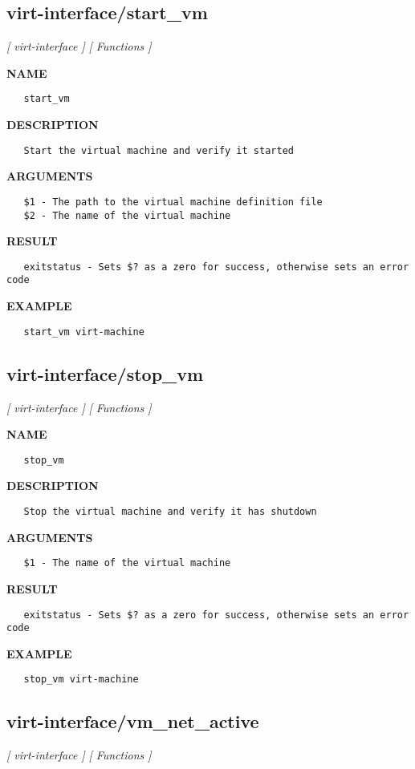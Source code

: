 \subsection{virt-interface/start\_vm}
\textsl{[ virt-interface ]}
\textsl{[ Functions ]}

\label{ch:robo63}
\label{ch:virt_interface_start_vm}
\textbf{NAME}
\begin{verbatim}
   start_vm
\end{verbatim}
\textbf{DESCRIPTION}
\begin{verbatim}
   Start the virtual machine and verify it started
\end{verbatim}
\textbf{ARGUMENTS}
\begin{verbatim}
   $1 - The path to the virtual machine definition file
   $2 - The name of the virtual machine
\end{verbatim}
\textbf{RESULT}
\begin{verbatim}
   exitstatus - Sets $? as a zero for success, otherwise sets an error code
\end{verbatim}
\textbf{EXAMPLE}
\begin{verbatim}
   start_vm virt-machine
\end{verbatim}
\newpage
\subsection{virt-interface/stop\_vm}
\textsl{[ virt-interface ]}
\textsl{[ Functions ]}

\label{ch:robo64}
\label{ch:virt_interface_stop_vm}
\textbf{NAME}
\begin{verbatim}
   stop_vm
\end{verbatim}
\textbf{DESCRIPTION}
\begin{verbatim}
   Stop the virtual machine and verify it has shutdown
\end{verbatim}
\textbf{ARGUMENTS}
\begin{verbatim}
   $1 - The name of the virtual machine
\end{verbatim}
\textbf{RESULT}
\begin{verbatim}
   exitstatus - Sets $? as a zero for success, otherwise sets an error code
\end{verbatim}
\textbf{EXAMPLE}
\begin{verbatim}
   stop_vm virt-machine
\end{verbatim}
\newpage
\subsection{virt-interface/vm\_net\_active}
\textsl{[ virt-interface ]}
\textsl{[ Functions ]}


